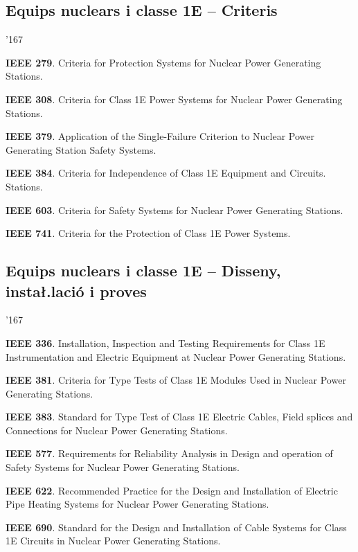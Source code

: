 \subsection*{Equips nuclears i classe 1E -- Criteris} 
\begin{dinglist}{'167}
    \item \textbf{IEEE 279}. Criteria for Protection Systems for Nuclear Power Generating Stations.
    \item \textbf{IEEE 308}. Criteria for Class 1E Power Systems for Nuclear Power Generating Stations.
    \item \textbf{IEEE 379}. Application of the Single-Failure Criterion to Nuclear Power Generating Station Safety Systems.
    \item \textbf{IEEE 384}. Criteria for Independence of Class 1E Equipment and Circuits.
        Stations.
    \item \textbf{IEEE 603}. Criteria for Safety Systems for Nuclear Power Generating Stations.
    \item \textbf{IEEE 741}. Criteria for the Protection of Class 1E Power Systems.
\end{dinglist}


\subsection*{Equips nuclears i classe 1E -- Disseny, insta{\l.l}aci\'{o} i proves}
\begin{dinglist}{'167}
    \item \textbf{IEEE 336}. Installation, Inspection and Testing Requirements for Class 1E Instrumentation and Electric Equipment at Nuclear Power Generating Stations.
     \item \textbf{IEEE 381}. Criteria for Type Tests of Class 1E Modules Used in Nuclear Power Generating Stations.
    \item \textbf{IEEE 383}. Standard for Type Test of Class 1E Electric Cables, Field splices and Connections for Nuclear Power Generating Stations.
    \item \textbf{IEEE 577}. Requirements for Reliability Analysis in Design and operation of Safety Systems for Nuclear Power Generating Stations.
    \item \textbf{IEEE 622}. Recommended Practice for the Design and Installation of Electric Pipe Heating Systems for Nuclear Power Generating Stations.
    \item \textbf{IEEE 690}. Standard for the Design and Installation of Cable Systems for Class 1E Circuits in Nuclear Power Generating Stations.
\end{dinglist}


